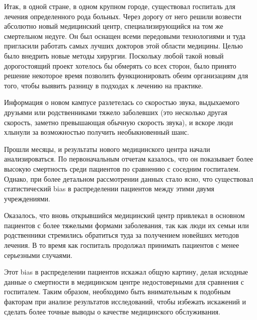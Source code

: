 \documentclass{article}
\begin{document}
        Итак, в одной стране, в одном крупном городе, существовал госпиталь для лечения определенного рода больных. Через дорогу от него решили возвести абсолютно новый медицинский центр, специализирующийся на том же смертельном недуге. Он был оснащен всеми передовыми технологиями и туда пригласили работать самых лучших докторов этой области медицины. Целью было внедрить новые методы хирургии. Поскольку любой такой новый дорогостоящий проект хотелось бы обмерять со всех сторон, было принято решение некоторое время позволить функционировать обеим организациям для того, чтобы выявить разницу в подходах к лечению на практике.

        Информация о новом кампусе разлетелась со скоростью звука, выдыхаемого друзьями или родственниками тяжело заболевших (это несколько другая скорость, заметно превышающая обычную скорость звука), и вскоре люди хлынули за возможностью получить необыкновенный шанс.

        Прошли месяцы, и результаты нового медицинского центра начали анализироваться. По первоначальным отчетам казалось, что он показывает более высокую смертность среди пациентов по сравнению с соседним госпиталем. Однако, при более детальном рассмотрении данных стало ясно, что существовал статистический bias в распределении пациентов между этими двумя учреждениями.

        Оказалось, что вновь открывшийся медицинский центр привлекал в основном пациентов с более тяжелыми формами заболевания, так как люди их семьи или родственники стремились обратиться туда за получением новейших методов лечения. В то время как госпиталь продолжал принимать пациентов с менее серьезными случаями.

        Этот bias в распределении пациентов искажал общую картину, делая исходные данные о смертности в медицинском центре недостоверными для сравнения с госпиталем. Таким образом, необходимо быть внимательным к подобным факторам при анализе результатов исследований, чтобы избежать искажений и сделать более точные выводы о качестве медицинского обслуживания.
\end{document}
